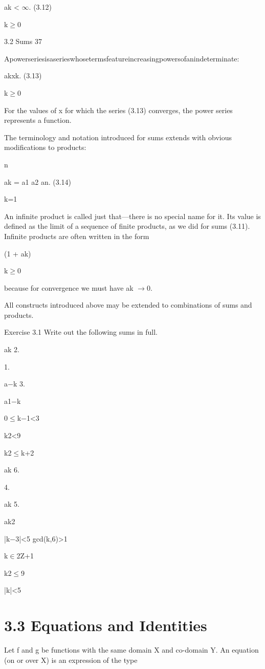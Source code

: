 \documentclass[11pt]{article}
\theoremstyle{plain}
\theoremstyle{definition}
\begin{document}
ak < $\infty$. (3.12)

k$\geq$0

3.2 Sums 37

Apowerseriesisaserieswhosetermsfeatureincreasingpowersofanindeterminate:

akxk. (3.13)

k$\geq$0

For the values of x for which the series (3.13) converges, the power series represents a function.

The terminology and notation introduced for sums extends with obvious modifications to products:

n

ak = a1 \textperiodcentered{} a2 \textperiodcentered{} \textperiodcentered{} \textperiodcentered{} an. (3.14)

k=1

An infinite product is called just that---there is no special name for it. Its value is defined as the limit of a sequence of finite products, as we did for sums (3.11). Infinite products are often written in the form

(1 + ak)

k$\geq$0

because for convergence we must have ak $\to$0.

All constructs introduced above may be extended to combinations of sums and products.

Exercise 3.1 Write out the following sums in full.

ak 2.

1.

a$-$k 3.

a1$-$k

0$\leq$k$-$1<3

k2<9

k2$\leq$k+2

ak 6.

4.

ak 5.

ak2

|k$-$3|<5 gcd(k,6)>1

k$\in$2Z+1

k2$\leq$9

|k|<5

\section{3.3 Equations and Identities}

Let f and g be functions with the same domain X and co-domain Y. An equation (on or over X) is an expression of the type
\end{document}

